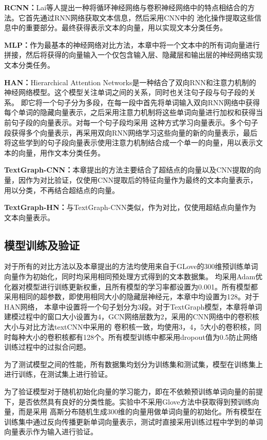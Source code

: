 \textbf{RCNN：}Lai等人提出一种将循环神经网络与卷积神经网络中的特点相结合的方法。它首先通过RNN网络获取文本信息，然后采用CNN中的
池化操作提取这些信息中的重要部分。最终获得表示文本的向量，用以实现文本分类任务。

\textbf{MLP：}作为最基本的神经网络对比方法，本章中将一个文本中的所有词向量进行拼接，然后将获得的向量输入一个仅包含输入层、隐藏层和输出层的神经网络实现文本分类任务。

\textbf{HAN：}Hierarchical Attention Networks是一种结合了双向RNN和注意力机制的神经网络模型。这个模型关注单词之间的关系，同时也关注句子段与句子段的关系。
即它将一个句子分为多段，在每一段中首先将单词输入双向RNN网络中获得每个单词的隐藏向量表示，之后采用注意力机制将这些单词向量进行加权和获得当前句子段的向量表示。对每一个句子段均采用
这种方式学习向量表示。多个句子段获得多个向量表示，再采用双向RNN网络学习这些向量的新的向量表示，最后将这些学到的句子段向量表示使用注意力机制结合成一个单一的向量，用以表示文本的向量，用作文本分类任务。

\textbf{TextGraph-CNN：}本章提出的方法主要结合了超结点的向量以及CNN提取的向量，因作为对比验证，仅使用CNN提取后的特征向量作为最终的文本向量表示，用以分类，不再结合超结点的向量。

\textbf{TextGraph-HN：}与TextGraph-CNN类似，作为对比，仅使用超结点向量作为文本向量表示。
\subsection{模型训练及验证}
对于所有的对比方法以及本章提出的方法均使用来自于GLove的300维预训练单词向量作为初始化，同时均采用相同预处理方式得到的文本数据集。
均采用Adam优化器对模型进行训练更新权重，且所有模型的学习率都设置为0.001。所有模型都采用相同的超参数，即使用相同大小的隐藏层神经元，本章中均设置为128。对于HAN网络，
本章中设置将一个句子划分为3段。对于TextGraph模型，本章将单词建模过程中的窗口大小设置为4，GCN网络层数为2，采用的CNN网络中的卷积核大小与对比方法textCNN中采用的
卷积核一致，均使用3，4，5大小的卷积核，同时每种大小的卷积核都有128个。所有模型训练中都采用dropout值为0.5防止网络训练过程中的过拟合问题。

为了测试模型之间的性能，所有数据集均划分为训练集和测试集，模型在训练集上进行训练，在测试集上进行验证。

为了验证模型对于随机初始化向量的学习能力，即在不依赖预训练单词向量的前提下，是否依然具有良好的分类性能。实验中不采用Glove方法中获取得到预训练向量，而是采用
高斯分布随机生成300维的向量用做单词向量的初始化。所有模型在训练集中通过反向传播更新单词向量表示，测试时直接采用训练过程中学到的单词向量表示作为输入进行验证。

